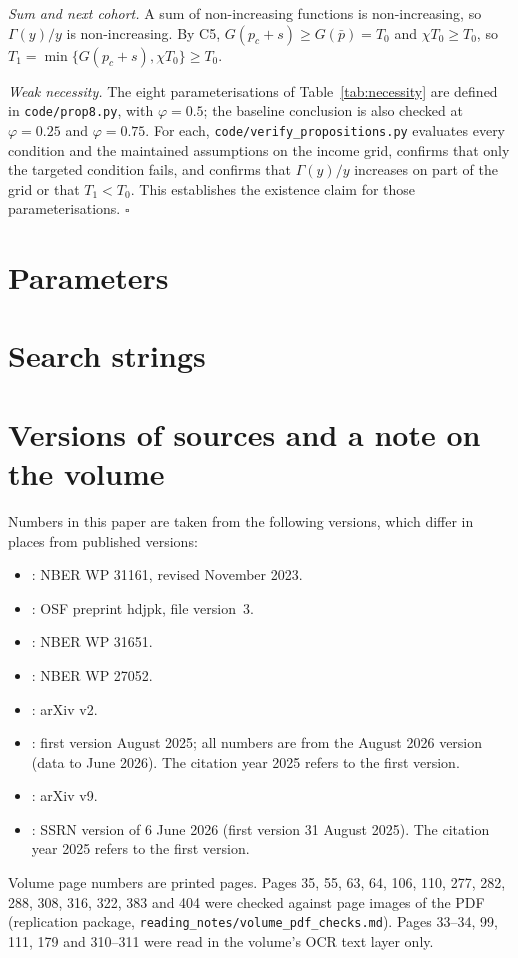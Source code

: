 \documentclass[12pt]{article}
\theoremstyle{remark}
\begin{document}
\emph{Sum and next cohort.} A sum of non-increasing functions is non-increasing, so $\Gamma(y)/y$ is non-increasing. By C5, $G(p_c+s)\ge G(\bar p)=T_0$ and $\chi T_0\ge T_0$, so $T_1=\min\{G(p_c+s),\chi T_0\}\ge T_0$.

\emph{Weak necessity.} The eight parameterisations of Table~\ref{tab:necessity} are defined in \texttt{code/prop8.py}, with $\varphi=0.5$; the baseline conclusion is also checked at $\varphi=0.25$ and $\varphi=0.75$. For each, \texttt{code/verify\_propositions.py} evaluates every condition and the maintained assumptions on the income grid, confirms that only the targeted condition fails, and confirms that $\Gamma(y)/y$ increases on part of the grid or that $T_1<T_0$. This establishes the existence claim for those parameterisations. $\square$

\section{Parameters}\label{app:params}


\section{Search strings}\label{app:search}


\section{Versions of sources and a note on the volume}\label{app:versions}\label{app:volume}
Numbers in this paper are taken from the following versions, which differ in places from published versions:
\begin{itemize}[itemsep=0pt]
\item \citet{brynjolfsson2025work}: NBER WP 31161, revised November 2023.
\item \citet{otis2026uneven}: OSF preprint hdjpk, file version~3.
\item \citet{dube2025policing}: NBER WP 31651.
\item \citet{acemoglu2020tax}: NBER WP 27052.
\item \citet{steyvers2025know}: arXiv v2.
\item \citet{brynjolfsson2025canaries}: first version August 2025; all numbers are from the August 2026 version (data to June 2026). The citation year 2025 refers to the first version.
\item \citet{ide2025automation}: arXiv v9.
\item \citet{hosseini2025seniority}: SSRN version of 6 June 2026 (first version 31 August 2025). The citation year 2025 refers to the first version.
\end{itemize}
Volume page numbers are printed pages. Pages 35, 55, 63, 64, 106, 110, 277, 282, 288, 308, 316, 322, 383 and 404 were checked against page images of the PDF (replication package, \texttt{reading\_notes/volume\_pdf\_checks.md}). Pages 33--34, 99, 111, 179 and 310--311 were read in the volume's OCR text layer only.
\end{document}
